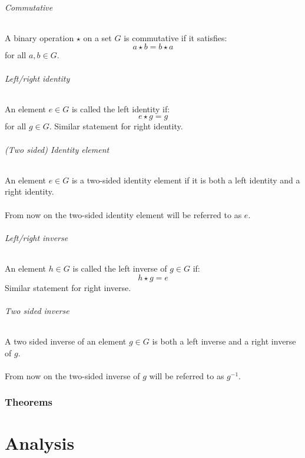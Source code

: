 \documentclass{article}
\begin{document}
\paragraph{Commutative}
A binary operation $ \star $ on a set $ G $ is commutative if it satisfies:
\begin{equation}
a \star b = b \star a
\end{equation}
for all $ a, b \in G $.
\paragraph{Left/right identity}
An element $ e \in G $ is called the left identity if:
\begin{equation}
e \star g = g
\end{equation}
for all $ g \in G $. Similar statement for right identity.
\paragraph{(Two sided) Identity element}
An element $ e \in G $ is a two-sided identity element if it is both a left identity and a right identity.
\\\\
From now on the two-sided identity element will be referred to as $ e $.
\paragraph{Left/right inverse}
An element $ h \in G $ is called the left inverse  of $ g \in G $ if:
\begin{equation}
h \star g = e
\end{equation}
Similar statement for right inverse.
\paragraph{Two sided inverse}
A two sided inverse of an element $ g \in G $ is both a left inverse and a right inverse of $ g $.
\\\\
From now on the two-sided inverse of $ g $ will be referred to as $ g^{-1} $.

\section{Theorems}

\newpage
\part{Analysis}
\end{document}
